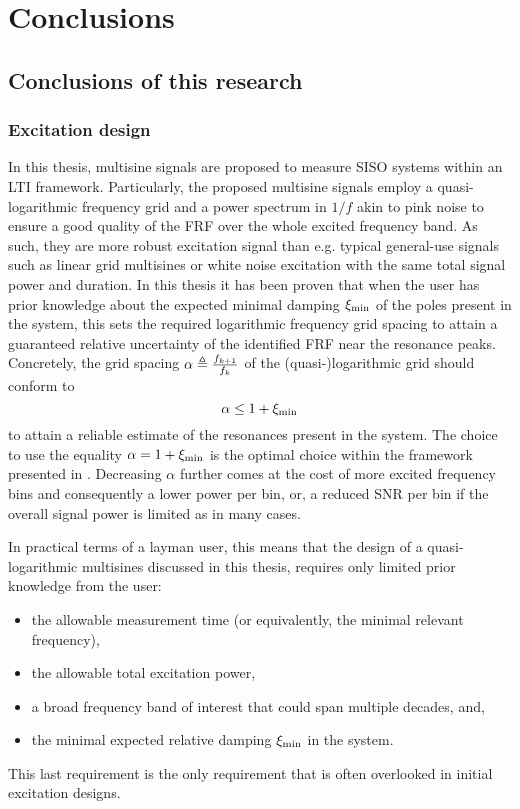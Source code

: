 \chapter{Conclusions}

\section{Conclusions of this research}

  \subsection{Excitation design}
  In this thesis, multisine signals are proposed to measure \gls{SISO} systems within an \gls{LTI} framework.
  Particularly, the proposed multisine signals employ a quasi-logarithmic frequency grid and a power spectrum in $1/f$ akin to pink noise to ensure a good quality of the \gls{FRF} over the whole excited frequency band.
  As such, they are more robust excitation signal than e.g. typical general-use signals such as linear grid multisines or white noise excitation with the same total signal power and duration.
  In this thesis it has been proven that when the user has prior knowledge about the expected minimal damping $\xi_{\min}$ of the poles present in the system, this sets the required logarithmic frequency grid spacing to attain a guaranteed relative uncertainty of the identified \gls{FRF} near the resonance peaks.
  Concretely, the grid spacing $\alpha \triangleq \frac{f_{k+1}}{f_k}$ of the (quasi-)logarithmic grid should conform to
  \begin{equation}
    \alpha \leq 1 + \xi_{\min}
  \end{equation}
  to attain a reliable estimate of the resonances present in the system.
  The choice to use the equality $\alpha = 1+ \xi_{\min}$ is the optimal choice within the framework presented in . 
  Decreasing $ \alpha$ further comes at the cost of more excited frequency bins and consequently a lower power per bin, or, a reduced \gls{SNR} per bin if the overall signal power is limited as in many cases.

  In practical terms of a layman user, this means that the design of a quasi-logarithmic multisines discussed in this thesis, requires only limited prior knowledge from the user:
  \begin{itemize}
    \item the allowable measurement time (or equivalently, the minimal relevant frequency),
    \item the allowable total excitation power,
    \item a broad frequency band of interest that could span multiple decades, and,
    \item the minimal expected relative damping $\xi_{\min}$ in the system.
  \end{itemize}
  This last requirement is the only requirement that is often overlooked in initial excitation designs.
